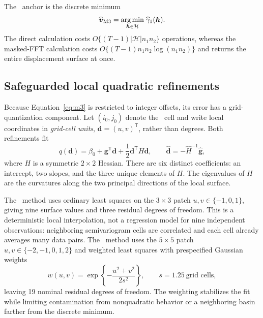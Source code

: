 The \Mthree\ anchor is the discrete minimum
\begin{equation}
 \widehat{\boldsymbol v}_{\mathrm{M3}}
 =\underset{\boldsymbol h\in\mathcal H}{\arg\min}\;
 \widehat\gamma_1(\boldsymbol h).
 \label{eq:m3}
\end{equation}
The direct calculation costs
$O\{(T-1)|\mathcal H|n_1n_2\}$ operations, whereas the masked-FFT calculation
costs $O\{(T-1)n_1n_2\log(n_1n_2)\}$ and returns the entire displacement
surface at once.

\subsection{Safeguarded local quadratic refinements}

Because Equation~\eqref{eq:m3} is restricted to integer offsets, its error has
a grid-quantization component.  Let $(i_0,j_0)$ denote the \Mthree\ cell and
write local coordinates in \emph{grid-cell units},
$\boldsymbol d=(u,v)^{\mathsf T}$, rather than degrees.  Both refinements fit
\begin{equation}
 q(\boldsymbol d)
 =\beta_0+\boldsymbol g^{\mathsf T}\boldsymbol d
 +\frac{1}{2}\boldsymbol d^{\mathsf T}H\boldsymbol d,
 \qquad
 \widehat{\boldsymbol d}=-\widehat H^{-1}\widehat{\boldsymbol g},
 \label{eq:quadratic}
\end{equation}
where $H$ is a symmetric $2\times2$ Hessian.  There are six distinct
coefficients: an intercept, two slopes, and the three unique elements of $H$.
The eigenvalues of $H$ are the curvatures along the two principal directions
of the local surface.

The \Qthree\ method uses ordinary least squares on the $3\times3$ patch
$u,v\in\{-1,0,1\}$, giving nine surface values and three residual degrees of
freedom.  This is a deterministic local interpolation, not a regression model
for nine independent observations: neighboring semivariogram cells are
correlated and each cell already averages many data pairs.  The \Qfive\ method
uses the $5\times5$ patch $u,v\in\{-2,-1,0,1,2\}$ and weighted least squares
with prespecified Gaussian weights
\begin{equation}
 w(u,v)=\exp\left\{-\frac{u^2+v^2}{2s^2}\right\},
 \qquad s=1.25\ \text{grid cells},
 \label{eq:q5-weight}
\end{equation}
leaving 19 nominal residual degrees of freedom.  The weighting stabilizes the
fit while limiting contamination from nonquadratic behavior or a neighboring
basin farther from the discrete minimum.

